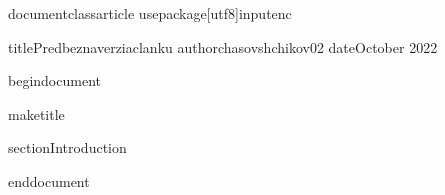 documentclass{article}
usepackage[utf8]{inputenc}

title{Predbeznaverziaclanku}
author{chasovshchikov02 }
date{October 2022}

begin{document}

maketitle

section{Introduction}

end{document}
